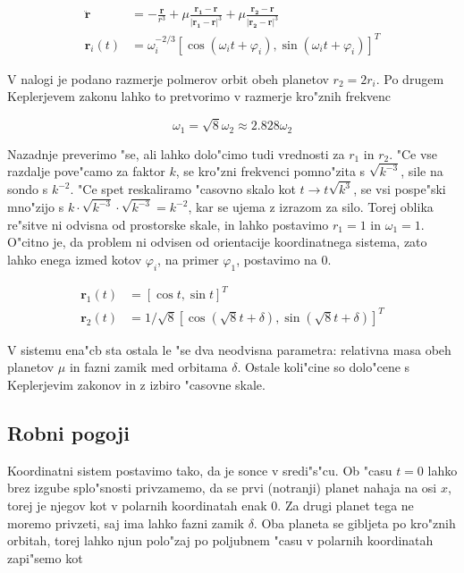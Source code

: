 \documentclass[a4paper,10pt]{article}
\renewcommand{\vec}{\mathbf}
\renewcommand{\phi}{\varphi}
\newcommand{\drug}[1]{
  \vec{\ddot{#1}}
}
\begin{document}
\begin{align}
\drug r &= -\frac{\vec r}{r^3} + \mu\frac{\vec{r_1-r}}{|\vec{r_1-r}|^3} + \mu\frac{\vec{r_2-r}}{|\vec{r_2-r}|^3} \label{eq:sonda} \\
\vec r_i(t) &= \omega_i^{-2/3} \left[ \cos(\omega_i t + \phi_i), \sin(\omega_i t + \phi_i) \right]^T
\end{align}

V nalogi je podano razmerje polmerov orbit obeh planetov $r_2 = 2r_i$. Po drugem Keplerjevem zakonu lahko to pretvorimo v razmerje kro"znih frekvenc

\[ \omega_1 = \sqrt{8}\omega_2 \approx 2.828 \omega_2 \]

Nazadnje preverimo "se, ali lahko dolo"cimo tudi vrednosti za $r_1$ in $r_2$. "Ce vse razdalje pove"camo za faktor $k$, se kro"zni frekvenci pomno"zita s $\sqrt{k^{-3}}$, sile na sondo s $k^{-2}$. "Ce spet reskaliramo "casovno skalo kot $t \to t\sqrt{k^3}$, se vsi pospe"ski mno"zijo s $k \cdot \sqrt{k^{-3}} \cdot \sqrt{k^{-3}} = k^{-2}$, kar se ujema z izrazom za silo. Torej oblika re"sitve ni odvisna od prostorske skale, in lahko postavimo $r_1 = 1$ in $\omega_1 = 1$. O"citno je, da problem ni odvisen od orientacije koordinatnega sistema, zato lahko enega izmed kotov $\phi_i$, na primer $\phi_1$, postavimo na 0. 

\begin{align}
 \vec r_1(t) &= \left[ \cos t, \sin t \right]^T \\
 \vec r_2(t) &= 1/\sqrt{8} \left[ \cos(\sqrt{8} t + \delta), \sin(\sqrt{8} t + \delta) \right]^T
\end{align}

V sistemu ena"cb sta ostala le "se dva neodvisna parametra: relativna masa obeh planetov $\mu$ in fazni zamik med orbitama $\delta$. Ostale koli"cine so dolo"cene s Keplerjevim zakonov in z izbiro "casovne skale. 

\subsection{Robni pogoji}

Koordinatni sistem postavimo tako, da je sonce v sredi"s"cu. Ob "casu $t=0$ lahko brez izgube splo"snosti privzamemo, da se prvi (notranji) planet nahaja na osi $x$, torej je njegov kot v polarnih koordinatah enak 0. Za drugi planet tega ne moremo privzeti, saj ima lahko fazni zamik $\delta$. Oba planeta se gibljeta po kro"znih orbitah, torej lahko njun polo"zaj po poljubnem "casu v polarnih koordinatah zapi"semo kot
\end{document}
